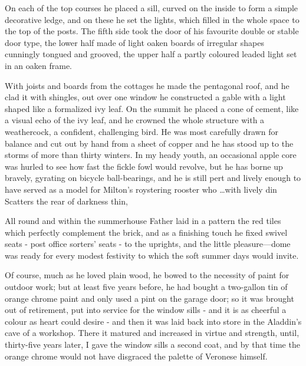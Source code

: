 On each of the top courses he placed a sill, curved on the inside to form a simple decorative ledge, and on these he set the lights, which filled in the whole space to the top of the posts. The fifth side took the door of his favourite double or stable door type, the lower half made of light oaken boards of irregular shapes cunningly tongued and grooved, the upper half a partly coloured leaded light set in an oaken frame.

With joists and boards from the cottages he made the pentagonal roof, and he clad it with shingles, out over one window he constructed a gable with a light shaped like a formalized ivy leaf. On the summit he placed a cone of cement, like a visual echo of the ivy leaf, and he crowned the whole structure with a weathercock, a confident, challenging bird. He was most carefully drawn for balance and cut out by hand from a sheet of copper and he has stood up to the storms of more than thirty winters. In my heady youth, an occasional apple core was hurled to see how fast the fickle fowl would revolve, but he has borne up bravely, gyrating on bicycle ball-bearings, and he is still pert and lively enough to have served as a model for Milton's roystering rooster who
…with lively din
Scatters the rear of darkness thin,

All round and within the summerhouse Father laid in a pattern the red tiles which perfectly complement the brick, and as a finishing touch he fixed swivel seats - post office sorters' seats - to the uprights, and the little pleasure—dome was ready for every modest festivity to which the soft summer days would invite.

Of course, much as he loved plain wood, he bowed to the necessity of paint for outdoor work; but at least five years before, he had bought a two-gallon tin of orange chrome paint and only used a pint on the garage door; so it was brought out of retirement, put into service for the window sills - and it is as cheerful a colour as heart could desire - and then it was laid back into store in the Aladdin's cave of a workshop. There it matured and increased in virtue and strength, until, thirty-five years later, I gave the window sills a second coat, and by that time the orange chrome would not have disgraced the palette of Veronese himself.
 
